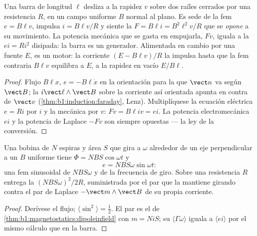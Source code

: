 \begin{proposition}\label{prop:b1:induction:rails}
Una barra de longitud $\ell$ desliza a la rapidez $v$ sobre dos raíles
cerrados por una resistencia $R$, en un campo uniforme $B$ normal al
plano. Es sede de la fem $e = B\ell v$, impulsa $i = B\ell v/R$ y siente
la  $F = B\ell i = B^2\ell^2v/R$ que se \emph{opone} a su
movimiento. La potencia mecánica que se gasta en empujarla, $Fv$, iguala
a la  $ei = Ri^2$ disipada: la barra es un generador.
Alimentada en cambio por una fuente $E$, es un motor: la corriente
$(E - B\ell v)/R$ la impulsa hasta que la fem contraria $B\ell v$
equilibra a $E$, a la rapidez en vacío $E/B\ell$.
\end{proposition}

\begin{proof}
Flujo $B\ell x$, $e = -B\ell\dot x$ en la orientación para la que $\vect n$
va según $\vect B$; la  $i\vect\ell\wedge\vect B$ sobre la
corriente así orientada apunta en contra de $\vect v$
(\cref{thm:b1:induction:faraday}, Lenz). Multiplíquese la ecuación
eléctrica $e = Ri$ por $i$ y la mecánica por $v$: $Fv = B\ell iv = ei$. La
potencia electromecánica $ei$ y la potencia de Laplace $-Fv$ son siempre
opuestas --- la ley de la conversión.
\end{proof}

\begin{proposition}\label{prop:b1:induction:alternator}
Una bobina de $N$ espiras y área $S$ que gira a $\omega$ alrededor de un
eje perpendicular a un $B$ uniforme tiene $\Phi = NBS\cos\omega t$ y
\[
e = NBS\omega\sin\omega t :
\]
una fem sinusoidal de  $NBS\omega$ y de la frecuencia de giro.
Sobre una resistencia $R$ entrega la  $(NBS\omega)^2/2R$,
suministrada por el par que la mantiene girando contra el par de Laplace
$-\vect m\wedge\vect B$ de su propia corriente.
\end{proposition}

\begin{proof}
Derívese el flujo; $\langle\sin^2\rangle = \tfrac12$. El par es el de
\cref{thm:b1:magnetostatics:dipoleinfield} con $m = Ni S$; su  $\langle\Gamma\omega\rangle$ iguala a $\langle ei\rangle$ por el mismo
cálculo que en la barra.
\end{proof}

